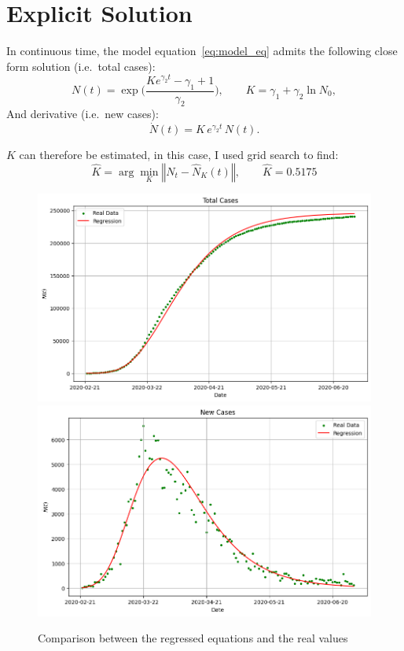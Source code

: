 \documentclass[12pt]{article}
\begin{document}
    \section{Explicit Solution}
    In continuous time, the model equation~\eqref{eq:model_eq} admits the following close form solution (i.e.\ total cases):
    \begin{equation}
        N(t)=\exp\Biggl(\frac{K e^{\gamma_2t}-\gamma_1+1}{\gamma_2}\Biggr), \qquad K=\gamma_1+\gamma_2\ln N_0,
    \end{equation}
    And derivative (i.e.\ new cases):
    \begin{equation}
        \dot N(t) =K\,e^{\gamma_2t}\,N(t).
    \end{equation}

    $K$ can therefore be estimated, in this case, I used grid search to find:
    \begin{equation}
        \hat K = \arg\min _{K} \left \Vert  N_t - \hat N_K(t) \right \Vert, \qquad \hat K = 0.5175
    \end{equation}

    \begin{figure}[h!]
        \centering
        \includegraphics[width=0.6\linewidth]{plots/total_with_data}\\
        \includegraphics[width=0.6\linewidth]{plots/new_with_data}
        \caption{Comparison between the regressed equations and the real values}
        \label{fig:results}
    \end{figure}
\end{document}
